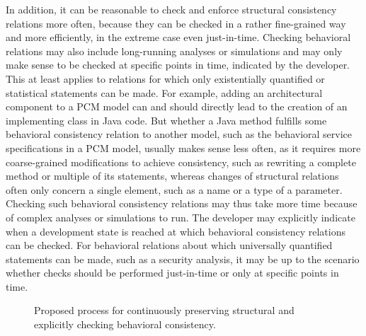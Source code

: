 In addition, it can be reasonable to check and enforce structural consistency relations more often, because they can be checked in a rather fine-grained way and more efficiently, in the extreme case even just-in-time.
Checking behavioral relations may also include long-running analyses or simulations and may only make sense to be checked at specific points in time, indicated by the developer.
This at least applies to relations for which only existentially quantified or statistical statements can be made.
For example, adding an architectural component to a \gls{PCM} model can and should directly lead to the creation of an implementing class in Java code. %
But whether a Java method fulfills some behavioral consistency relation to another model, such as the behavioral service specifications in a \gls{PCM} model, usually makes sense less often, as it requires more coarse-grained modifications to achieve consistency, such as rewriting a complete method or multiple of its statements, whereas changes of structural relations often only concern a single element, such as a name or a type of a parameter.
Checking such behavioral consistency relations may thus take more time because of complex analyses or simulations to run.
The developer may explicitly indicate when a development state is reached at which behavioral consistency relations can be checked.
For behavioral relations about which universally quantified statements can be made, such as a security analysis, it may be up to the scenario whether checks should be performed just-in-time or only at specific points in time.

\begin{figure}
    \centering
    
    \caption[Process for preserving structural and behavioral consistency]{Proposed process for continuously preserving structural and explicitly checking behavioral consistency.}
    \label{fig:networks:process_structure_behavior}
\end{figure}

